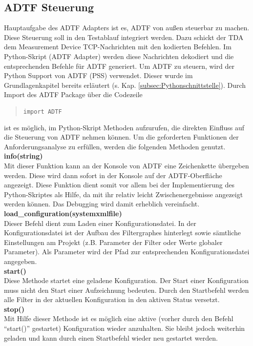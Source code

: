 \documentclass[12pt,a4paper]{report}
\begin{document}
\subsection{ADTF Steuerung}\label{subsec:ADTF Steuerung}
Hauptaufgabe des ADTF Adapters ist es, ADTF von au\ss en steuerbar zu machen. Diese Steuerung soll in den Testablauf integriert werden. Dazu schickt der TDA dem Measurement Device TCP-Nachrichten mit den kodierten Befehlen. Im Python-Skript (ADTF Adapter) werden diese Nachrichten dekodiert und die entsprechenden Befehle für ADTF generiert. Um ADTF zu steuern, wird der Python Support von ADTF (PSS) verwendet. Dieser wurde im Grundlagenkapitel bereits erläutert (s. Kap. \ref{subsec:Pythonschnittstelle}). Durch Import des ADTF Package über die Codezeile
\begin{quote}
\verb|import ADTF|
\end{quote}
ist es möglich, im Python-Skript Methoden aufzurufen, die direkten Einfluss auf die Steuerung von ADTF nehmen können.
Um die geforderten Funktionen der Anforderungsanalyse zu erfüllen, werden die folgenden Methoden genutzt.
\\[0.5cm]
\textbf{info(string)}
\\Mit dieser Funktion kann an der Konsole von ADTF eine Zeichenkette übergeben werden. Diese wird dann sofort in der Konsole auf der ADTF-Oberfläche angezeigt. Diese Funktion dient somit vor allem bei der Implementierung des Python-Skriptes als Hilfe, da mit ihr relativ leicht Zwischenergebnisse angezeigt werden können. Das Debugging wird damit erheblich vereinfacht.
\\[0.5cm]
\textbf{load\_configuration(systemxmlfile)}
\\Dieser Befehl dient zum Laden einer Konfigurationsdatei. In der Konfigurationsdatei ist der Aufbau des Filtergraphes hinterlegt sowie sämtliche Einstellungen am Projekt (z.B. Parameter der Filter oder Werte globaler Parameter). Als Parameter wird der Pfad zur entsprechenden Konfigurationsdatei angegeben.
\\[0.5cm]
\textbf{start()}
\\Diese Methode startet eine geladene Konfiguration. Der Start einer Konfiguration muss nicht den Start einer Aufzeichnung bedeuten. Durch den Startbefehl werden alle Filter in der aktuellen Konfiguration in den aktiven Status versetzt.
\\[0.5cm]
\textbf{stop()}
\\Mit Hilfe dieser Methode ist es möglich eine aktive (vorher durch den Befehl "`start()"' gestartet) Konfiguration wieder anzuhalten. Sie bleibt jedoch weiterhin geladen und kann durch einen Startbefehl wieder neu gestartet werden.
\end{document}
